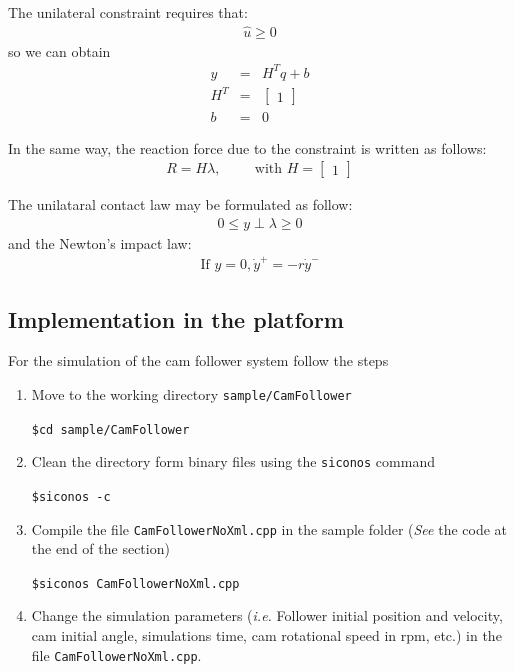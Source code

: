 The unilateral constraint requires that:
\begin{eqnarray}
\label{eq:constr} \nonumber
 \hat u \geq 0
\end{eqnarray}
so we can obtain
\begin{eqnarray}
y &= & H^T q + b \\
\nonumber H^T &=&\left[\begin{array}{c} 1 \end{array}\right]\\
\nonumber b&=&0
\end{eqnarray}

In the same way, the reaction force due to the constraint is
written as follows:
\begin{eqnarray}
\nonumber R=H \lambda, \hspace{1cm}  \text{with }
H=\left[\begin{array}{c} 1
\end{array}\right]
\end{eqnarray}

The unilataral contact law may be formulated as follow:
\begin{eqnarray}
  \label{eq:17}
  0 \leq y \perp \lambda\geq 0
\end{eqnarray}
and the Newton's impact law:
\begin{eqnarray}
  \label{eq:17}
\text{If } y=0, \dot{y}^+ =-r\dot{y}^-
\end{eqnarray}

\subsection{Implementation in the platform}
For the simulation of the cam follower system follow the steps

\begin{enumerate}
\item Move to the working directory \verb"sample/CamFollower"

\verb"$cd sample/CamFollower "

\item Clean the directory form binary files using the
\verb"siconos" command

\verb"$siconos -c "

\item Compile the file \verb"CamFollowerNoXml.cpp" in
the sample folder ({\em See} the code at the end of the section)

\verb"$siconos CamFollowerNoXml.cpp"

\item Change the simulation parameters ({\em i.e.}
Follower initial position and velocity, cam initial angle,
simulations time, cam rotational speed in rpm, etc.) in the file
\verb"CamFollowerNoXml.cpp".

\end{enumerate}

